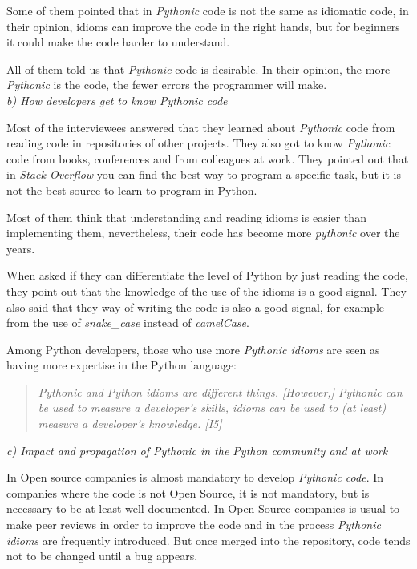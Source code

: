 \documentclass[a4paper]{article}
\begin{document}
Some of them pointed that in \textit{Pythonic} code is not the same as idiomatic code, in their opinion, idioms can improve the code in the right hands, but for beginners it could make the code harder to understand.

All of them told us that \textit{Pythonic} code is desirable. In their opinion, the more \textit{Pythonic} is the code, the fewer errors the programmer will make.
\\

\textit{b) How developers get to know Pythonic code}

Most of the interviewees answered that they learned about \textit{Pythonic} code from reading code in repositories of other projects. They also got to know \textit{Pythonic} code from books, conferences and from colleagues at work.
They pointed out that in \textit{Stack Overflow} you can find the best way to program a specific task, but it is not the best source to learn to program in Python.

Most of them think that understanding and reading idioms is easier than implementing them, nevertheless, their code has become more \textit{pythonic} over the years.

When asked if they can differentiate the level of Python by just reading the code, they point out that the knowledge of the use of the idioms is a good signal. They also said that they way of writing the code is also a good signal, for example from the use of \textit{snake\_case} instead of \textit{camelCase}.


Among Python developers, those who use more \textit{Pythonic idioms} are seen as having more expertise in the Python language:
\begin{quote}
\textit{
    \textit{Pythonic} and Python idioms are different things. [However,] \textit{Pythonic} can be used to measure a developer’s skills, idioms can be used to (at least) measure a developer’s knowledge. [I5]
}
\end{quote}



\textit{c) Impact and propagation of Pythonic in the Python community and at work}

In Open source companies is almost mandatory to develop \textit{Pythonic code}. In companies where the code is not Open Source, it is not mandatory, but is necessary to be at least well documented. In Open Source companies is usual to make peer reviews in order to improve the code and in the process \textit{Pythonic idioms} are frequently introduced. But once merged into the repository, code tends not to be changed until a bug appears.
\end{document}
